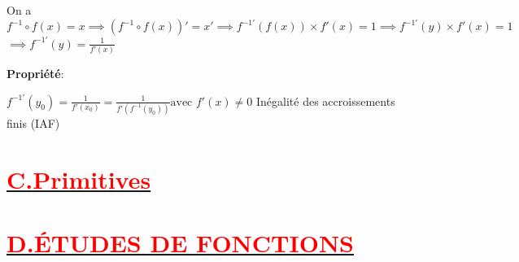 \documentclass[12pt]{article}
\begin{document}
On a 
\( f^{-1}\circ f(x)=x \implies (f^{-1}\circ f(x))'=x' \implies f^{-1'}(f(x))\times f'(x)=1 \implies f^{-1'}(y)\times f'(x)=1\)
\( \implies f^{-1'}(y) = \frac{1}{f'(x)}\)

\textbf{Propriété}:

\( f^{-1'}(y_{0})=\frac{1}{f'(x_{0})}=\frac{1}{f'(f^{-1}(y_{0}))} \text{avec } f'(x)\neq 0\)
Inégalité des accroissements finis (IAF)
\section*{\underline{\textbf{\textcolor{red}{C.Primitives}}}}

\section*{\underline{\textbf{\textcolor{red}{D.ÉTUDES DE FONCTIONS}}}}
\end{document}

